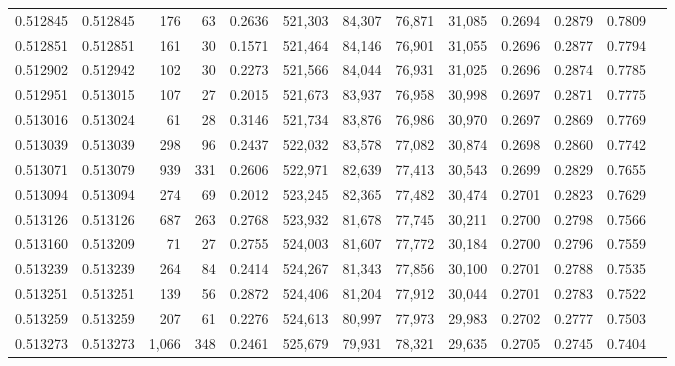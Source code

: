 \begin{tabular}{rrrrrrrrrrrrr}
0.512845 & 0.512845 &   176 &    63 &                                     0.2636 & 521,303 &  84,307 &  76,871 &  31,085 & 0.2694 & 0.2879 & 0.7809 \\
0.512851 & 0.512851 &   161 &    30 &                                     0.1571 & 521,464 &  84,146 &  76,901 &  31,055 & 0.2696 & 0.2877 & 0.7794 \\
0.512902 & 0.512942 &   102 &    30 &                                     0.2273 & 521,566 &  84,044 &  76,931 &  31,025 & 0.2696 & 0.2874 & 0.7785 \\
0.512951 & 0.513015 &   107 &    27 &                                     0.2015 & 521,673 &  83,937 &  76,958 &  30,998 & 0.2697 & 0.2871 & 0.7775 \\
0.513016 & 0.513024 &    61 &    28 &                                     0.3146 & 521,734 &  83,876 &  76,986 &  30,970 & 0.2697 & 0.2869 & 0.7769 \\
0.513039 & 0.513039 &   298 &    96 &                                     0.2437 & 522,032 &  83,578 &  77,082 &  30,874 & 0.2698 & 0.2860 & 0.7742 \\
0.513071 & 0.513079 &   939 &   331 &                                     0.2606 & 522,971 &  82,639 &  77,413 &  30,543 & 0.2699 & 0.2829 & 0.7655 \\
0.513094 & 0.513094 &   274 &    69 &                                     0.2012 & 523,245 &  82,365 &  77,482 &  30,474 & 0.2701 & 0.2823 & 0.7629 \\
0.513126 & 0.513126 &   687 &   263 &                                     0.2768 & 523,932 &  81,678 &  77,745 &  30,211 & 0.2700 & 0.2798 & 0.7566 \\
0.513160 & 0.513209 &    71 &    27 &                                     0.2755 & 524,003 &  81,607 &  77,772 &  30,184 & 0.2700 & 0.2796 & 0.7559 \\
0.513239 & 0.513239 &   264 &    84 &                                     0.2414 & 524,267 &  81,343 &  77,856 &  30,100 & 0.2701 & 0.2788 & 0.7535 \\
0.513251 & 0.513251 &   139 &    56 &                                     0.2872 & 524,406 &  81,204 &  77,912 &  30,044 & 0.2701 & 0.2783 & 0.7522 \\
0.513259 & 0.513259 &   207 &    61 &                                     0.2276 & 524,613 &  80,997 &  77,973 &  29,983 & 0.2702 & 0.2777 & 0.7503 \\
0.513273 & 0.513273 & 1,066 &   348 &                                     0.2461 & 525,679 &  79,931 &  78,321 &  29,635 & 0.2705 & 0.2745 & 0.7404 \\

\end{tabular}

